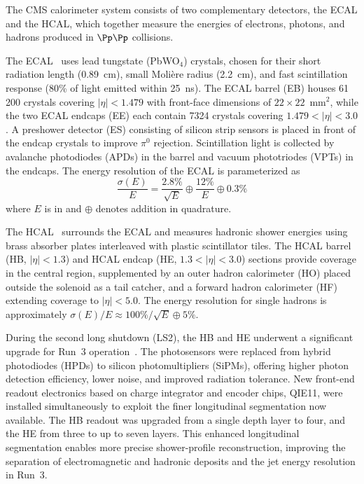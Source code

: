 The CMS calorimeter system consists of two complementary detectors, the ECAL and the HCAL, which together measure the energies of electrons, photons, and hadrons produced in $\Pp\Pp$ collisions.

The ECAL~\cite{CMS:2013lxn} uses lead tungstate (PbWO$_4$) crystals, chosen for their short radiation length (0.89~cm), small Molière radius (2.2~cm), and fast scintillation response (80\% of light emitted within 25~ns). The ECAL barrel (EB) houses 61\,200 crystals covering $|\eta| < 1.479$ with front-face dimensions of $22 \times 22$~mm$^2$, while the two ECAL endcaps (EE) each contain 7324 crystals covering $1.479 < |\eta| < 3.0$. A preshower detector (ES) consisting of silicon strip sensors is placed in front of the endcap crystals to improve $\pi^0$ rejection. Scintillation light is collected by avalanche photodiodes (APDs) in the barrel and vacuum phototriodes (VPTs) in the endcaps. The energy resolution of the ECAL is parameterized as
\begin{equation}
\frac{\sigma(E)}{E} = \frac{2.8\%}{\sqrt{E}} \oplus \frac{12\%}{E} \oplus 0.3\%
\end{equation}
where $E$ is in \GeV and $\oplus$ denotes addition in quadrature.

The HCAL~\cite{CMS:2012sof} surrounds the ECAL and measures hadronic shower energies using brass absorber plates interleaved with plastic scintillator tiles. The HCAL barrel (HB, $|\eta| < 1.3$) and HCAL endcap (HE, $1.3 < |\eta| < 3.0$) sections provide coverage in the central region, supplemented by an outer hadron calorimeter (HO) placed outside the solenoid as a tail catcher, and a forward hadron calorimeter (HF) extending coverage to $|\eta| < 5.0$. The energy resolution for single hadrons is approximately $\sigma(E)/E \approx 100\%/\sqrt{E} \oplus 5\%$.

During the second long shutdown (LS2), the HB and HE underwent a significant upgrade for Run~3 operation~\cite{CMS:2023gfb}. The photosensors were replaced from hybrid photodiodes (HPDs) to silicon photomultipliers (SiPMs), offering higher photon detection efficiency, lower noise, and improved radiation tolerance. New front-end readout electronics based on charge integrator and encoder chips, QIE11, were installed simultaneously to exploit the finer longitudinal segmentation now available. The HB readout was upgraded from a single depth layer to four, and the HE from three to up to seven layers. This enhanced longitudinal segmentation enables more precise shower-profile reconstruction, improving the separation of electromagnetic and hadronic deposits and the jet energy resolution in Run~3.

